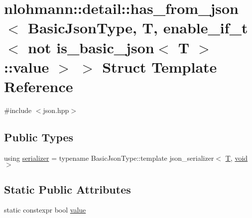 \hypertarget{structnlohmann_1_1detail_1_1has__from__json_3_01_basic_json_type_00_01_t_00_01enable__if__t_3_01e29213c543deddccc314d19cbaf9f3b4}{}\section{nlohmann\+::detail\+::has\+\_\+from\+\_\+json$<$ Basic\+Json\+Type, T, enable\+\_\+if\+\_\+t$<$ not is\+\_\+basic\+\_\+json$<$ T $>$\+::value $>$ $>$ Struct Template Reference}
\label{structnlohmann_1_1detail_1_1has__from__json_3_01_basic_json_type_00_01_t_00_01enable__if__t_3_01e29213c543deddccc314d19cbaf9f3b4}


{\ttfamily \#include $<$json.\+hpp$>$}

\subsection*{Public Types}
\begin{DoxyCompactItemize}
\item 
using \mbox{\hyperlink{structnlohmann_1_1detail_1_1has__from__json_3_01_basic_json_type_00_01_t_00_01enable__if__t_3_01e29213c543deddccc314d19cbaf9f3b4_ab17cea1be422b8985fc19942809560ed}{serializer}} = typename Basic\+Json\+Type\+::template json\+\_\+serializer$<$ \mbox{\hyperlink{_keyboard_event_8h_adf1f3edb9115acb0a1e04209b7a9937b}{T}}, \mbox{\hyperlink{namespacenlohmann_1_1detail_a59fca69799f6b9e366710cb9043aa77d}{void}} $>$
\end{DoxyCompactItemize}
\subsection*{Static Public Attributes}
\begin{DoxyCompactItemize}
\item 
static constexpr bool \mbox{\hyperlink{structnlohmann_1_1detail_1_1has__from__json_3_01_basic_json_type_00_01_t_00_01enable__if__t_3_01e29213c543deddccc314d19cbaf9f3b4_afb638d592883301228bcad21d83bf4aa}{value}}
\end{DoxyCompactItemize}


